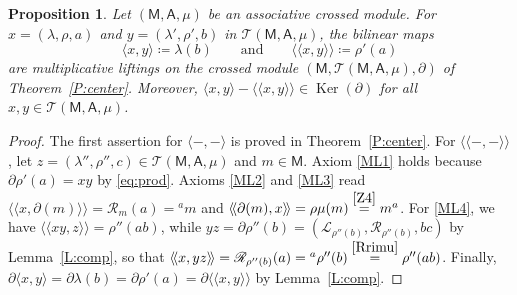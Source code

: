 \documentclass[12pt,reqno]{amsart}
\theoremstyle{plain}
\newtheorem{proposition}[theorem]{Proposition}
\theoremstyle{definition}
\theoremstyle{remark}
\def\lam{\lambda}
\def\Ker{\operatorname{Ker}}
\newcommand{\A}{\ensuremath{\mathsf{A}}}
\newcommand{\MM}{\ensuremath{\mathsf{M}}}
\newcommand{\T}{\ensuremath{\mathcal{T}}}
\newcommand{\LL}{\ensuremath{\mathcal{L}}}
\newcommand{\RR}{\ensuremath{\mathcal{R}}}
\numberwithin{equation}{section}
\begin{document}
\begin{proposition}\label{P:liftings}
	Let $(\MM,\A,\mu)$ be an associative crossed module. For $x=(\lam,\rho,a)$ and $y=(\lam',\rho',b)$ in $\T(\MM,\A,\mu)$, the bilinear maps
	\[
	\langle x,y\rangle\coloneqq\lam(b)\qquad\text{and}\qquad\langle\!\langle x,y\rangle\!\rangle\coloneqq\rho'(a)
	\]
	are multiplicative liftings on the crossed module $(\MM,\T(\MM,\A,\mu),\partial)$ of Theorem~\ref{P:center}. Moreover, $\langle x,y\rangle-\langle\!\langle x,y\rangle\!\rangle\in\Ker(\partial)$ for all $x,y\in\T(\MM,\A,\mu)$.
\end{proposition}
\begin{proof}
	The first assertion for $\langle-,-\rangle$ is proved in Theorem~\ref{P:center}. For $\langle\!\langle-,-\rangle\!\rangle$, let $z=(\lam'',\rho'',c)\in\T(\MM,\A,\mu)$ and $m\in\MM$. Axiom \eqref{ML1} holds because $\partial\rho'(a)=xy$ by \eqref{eq:prod}. Axioms \eqref{ML2} and \eqref{ML3} read $\langle\!\langle x,\partial(m)\rangle\!\rangle=\RR_m(a)={}^{a}m$ and $\langle\!\langle\partial(m),x\rangle\!\rangle=\rho\mu(m)\stackrel{\eqref{Z4}}{=}m^{a}$.
	 For \eqref{ML4}, we have $\langle\!\langle xy,z\rangle\!\rangle=\rho''(ab)$, while $yz=\partial\rho''(b)=(\LL_{\rho''(b)},\RR_{\rho''(b)},bc)$ by Lemma~\ref{L:comp},
	 so that $\langle\!\langle x,yz\rangle\!\rangle=\RR_{\rho''(b)}(a)={}^{a}\rho''(b)\stackrel{\eqref{Rrimu}}{=}\rho''(ab)$. Finally, $\partial\langle x,y\rangle=\partial\lam(b)=\partial\rho'(a)=\partial\langle\!\langle x,y\rangle\!\rangle$ by Lemma~\ref{L:comp}.
\end{proof}
\end{document}
